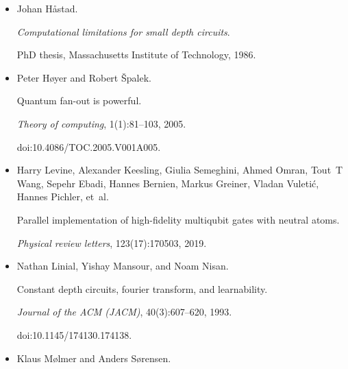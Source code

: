 \begin{itemize}
Jonas Haferkamp, Dominik Hangleiter, Adam Bouland, Bill Fefferman, Jens Eisert,
and Juani Bermejo-Vega.


Closing gaps of a quantum advantage with short-time hamiltonian
dynamics.


\emph{Physical Review Letters}, 125(25):250501, 2020.





\item[] 
[12]

Johan Håstad.


\emph{Computational limitations for small depth circuits}.


PhD thesis, Massachusetts Institute of Technology, 1986.





\item[] 
[13]

Peter Høyer and Robert Špalek.


Quantum fan-out is powerful.


\emph{Theory of computing}, 1(1):81–103, 2005.


doi:10.4086/TOC.2005.V001A005.





\item[] 
[14]

Harry Levine, Alexander Keesling, Giulia Semeghini, Ahmed Omran, Tout T Wang,
Sepehr Ebadi, Hannes Bernien, Markus Greiner, Vladan Vuletić, Hannes
Pichler, et al.


Parallel implementation of high-fidelity multiqubit gates with
neutral atoms.


\emph{Physical review letters}, 123(17):170503, 2019.





\item[] 
[15]

Nathan Linial, Yishay Mansour, and Noam Nisan.


Constant depth circuits, fourier transform, and learnability.


\emph{Journal of the ACM (JACM)}, 40(3):607–620, 1993.


doi:10.1145/174130.174138.





\item[] 
[16]

Klaus Mølmer and Anders Sørensen.



\end{itemize}
